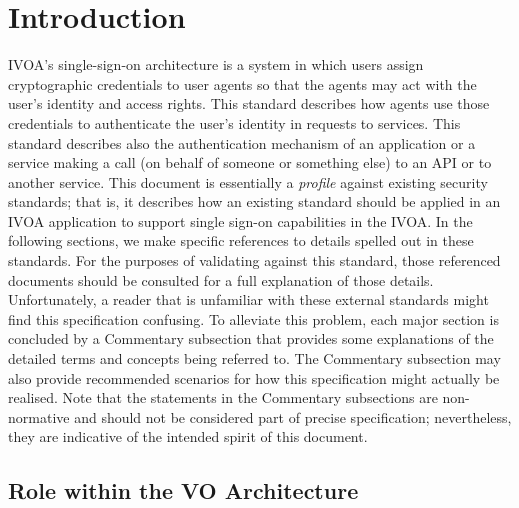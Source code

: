 \documentclass[11pt,a4paper]{ivoa}
\begin{document}
\section{Introduction}
IVOA's single-sign-on architecture is a system in which users assign cryptographic credentials to user agents so that the agents may act with the user's identity and access rights. This standard describes how agents use those credentials to authenticate the user's identity in requests to services. This standard describes also the authentication mechanism of an application or a service making a call (on behalf of someone or something else) to an API or to another service.
This document is essentially a {\em profile} against existing security standards; that is, it describes how an existing standard should be applied in an IVOA application to support single sign-on capabilities in the IVOA. In the following sections, we make specific references to details spelled out in these standards. For the purposes of validating against this standard, those referenced documents should be consulted for a full explanation of those details. Unfortunately, a reader that is unfamiliar with these external standards might find this specification confusing. To alleviate this problem, each major section is concluded by a Commentary subsection that provides some explanations of the detailed terms and concepts being referred to. The Commentary subsection may also provide recommended scenarios for how this specification might actually be realised. Note that the statements in the Commentary subsections are non-normative and should not be considered part of precise specification; nevertheless, they are indicative of the intended spirit of this document.

\subsection{Role within the VO Architecture}
\end{document}
